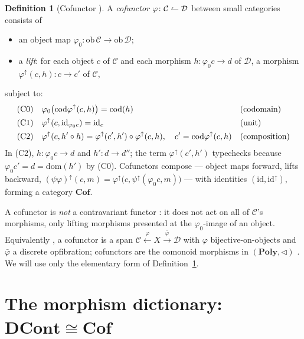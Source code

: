 \documentclass[11pt,a4paper]{amsart}
\newcommand{\Cof}{\mathbf{Cof}}
\newcommand{\DCont}{\mathbf{DCont}}
\newcommand{\Poly}{\mathbf{Poly}}
\newcommand{\id}{\mathrm{id}}
\newcommand{\cod}{\mathrm{cod}}
\newcommand{\dom}{\mathrm{dom}}
\newcommand{\ob}{\mathrm{ob}\,}
\newcommand{\co}{\mathrel{\text{\reflectbox{$\rightharpoonup$}}}}
\theoremstyle{plain}
\theoremstyle{definition}
\newtheorem{definition}[theorem]{Definition}
\theoremstyle{remark}
\begin{document}
\begin{definition}[Cofunctor \cite{Aguiar,Clarke20}]\label{def:cof}
A \emph{cofunctor} $\varphi\colon\mathcal C\co\mathcal D$ between small categories
consists of
\begin{itemize}[nosep]
  \item an object map $\varphi_0\colon\ob\mathcal C\to\ob\mathcal D$;
  \item a \emph{lift}: for each object $c$ of $\mathcal C$ and each morphism
        $h\colon\varphi_0 c\to d$ of $\mathcal D$, a morphism
        $\varphi^\uparrow(c,h)\colon c\to c'$ of $\mathcal C$,
\end{itemize}
subject to:
\begin{align}
  \text{(C0)}\quad & \varphi_0\big(\cod\varphi^\uparrow(c,h)\big)=\cod(h)
        && \text{(codomain)}\notag\\
  \text{(C1)}\quad & \varphi^\uparrow(c,\id_{\varphi_0 c})=\id_c
        && \text{(unit)}\notag\\
  \text{(C2)}\quad & \varphi^\uparrow(c,h'\circ h)
                   =\varphi^\uparrow(c',h')\circ\varphi^\uparrow(c,h),
        \quad c'=\cod\varphi^\uparrow(c,h)
        && \text{(composition)}\notag
\end{align}
In (C2), $h\colon\varphi_0 c\to d$ and $h'\colon d\to d''$; the term
$\varphi^\uparrow(c',h')$ typechecks because $\varphi_0 c'=d=\dom(h')$ by (C0).
Cofunctors compose --- object maps forward, lifts backward,
$(\psi\varphi)^\uparrow(c,m)=\varphi^\uparrow\big(c,\psi^\uparrow(\varphi_0 c,m)\big)$
--- with identities $(\id,\id^\uparrow)$, forming a category $\Cof$.
\end{definition}

A cofunctor is \emph{not} a contravariant functor \cite[p.\,188]{Clarke20}: it does not
act on all of $\mathcal C$'s morphisms, only lifting morphisms presented at the
$\varphi_0$-image of an object. Equivalently \cite{Clarke20}, a cofunctor is a span
$\mathcal C\xleftarrow{\ \varphi\ }X\xrightarrow{\ \bar\varphi\ }\mathcal D$ with
$\varphi$ bijective-on-objects and $\bar\varphi$ a discrete opfibration; cofunctors are
the comonoid morphisms in $(\Poly,\triangleleft)$ \cite{AU16,SS}. We will use only
the elementary form of Definition~\ref{def:cof}.

\section{The morphism dictionary: \texorpdfstring{$\DCont\cong\Cof$}{DCont = Cof}}\label{sec:dict}
\end{document}
